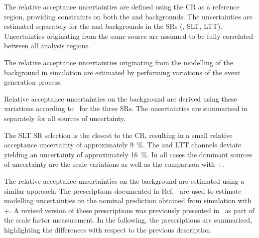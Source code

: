 



The relative acceptance uncertainties are defined using the \ZHF CR as a
reference region, providing constraints on both the \ZHF and \ttbar
backgrounds. The uncertainties are estimated separately for the \ZHF and \ttbar
backgrounds in the SRs (\hadhad, \lephad SLT, \lephad LTT). Uncertainties
originating from the same source are assumed to be fully correlated between all
analysis regions.

The relative acceptance uncertainties originating from the modelling of the \ZHF
background in simulation are estimated by performing variations of the event
generation process.


Relative acceptance uncertainties on the \ZHF background are derived using these
variations according to~ for the three
SRs. The uncertainties are summarised in~
separately for all sources of uncertainty.

The \lephad SLT SR selection is the closest to the \ZHF CR, resulting in a small
relative acceptance uncertainty of approximately \SI{9}{\percent}. The \hadhad
and \lephad LTT channels deviate yielding an uncertainty of approximately
\SI{16}{\percent}. In all cases the dominant sources of uncertainty are the
scale variations as well as the comparison with
\MGNLO+\PYTHIA[8].

The relative acceptance uncertainties on the \ttbar background are estimated
using a similar approach. The prescriptions documented in
Ref.~\cite{ATL-PHYS-PUB-2020-023} are used to estimate modelling uncertainties
on the nominal prediction obtained from simulation with
\POWHEGBOX[v2]+\PYTHIA[8]. A revised version of these prescriptions was
previously presented in~ as part of the
\ttbarFakes scale factor measurement. In the following, the prescriptions are
summarised, highlighting the differences with respect to the previous
description.

